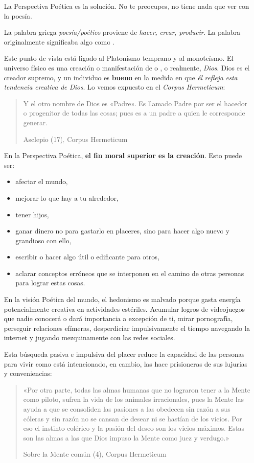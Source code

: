 \documentclass{article}
\begin{document}
	La Perspectiva Poética es la solución. No te preocupes, no tiene nada
	que ver con la poesía.

	La palabra griega \textit{poesía/poético} proviene de \textit{hacer,
	crear, producir}. La palabra  originalmente
	significaba algo como .

	Este punto de vista está ligado al Platonismo temprano y al monoteísmo.
	El universo físico es una creación o manifestación de
	 o , o realmente,
	\textit{Dios}. Dios es el creador supremo, y un individuo es
	\textbf{bueno} en la medida en que \textit{él refleja esta tendencia
	creativa de Dios}. Lo vemos expuesto en el \textit{Corpus Hermeticum}:

	\blockquote[Asclepio (17), Corpus Hermeticum \cite{uno}]
	{Y el otro nombre de Dios es «Padre». Es llamado Padre por ser el
	hacedor o progenitor de todas las cosas; pues es a un padre a quien le
	corresponde generar.}

	En la Perspectiva Poética, \textbf{el fin moral superior es la
	creación}. Esto puede ser:

	\begin{itemize}
	\item afectar el mundo,
	\item mejorar lo que hay a tu alrededor,
	\item tener hijos,
	\item ganar dinero no para gastarlo en placeres, sino para hacer algo
		nuevo y grandioso con ello,
	\item escribir o hacer algo útil o edificante para otros,
	\item aclarar conceptos erróneos que se interponen en el camino de otras
	personas para lograr estas cosas.
	\end{itemize}

	En la visión Poética del mundo, el hedonismo es malvado porque gasta
	energía potencialmente creativa en actividades estériles. Acumular logros
	de videojuegos que nadie conocerá o dará importancia a excepción de ti,
	mirar pornografía, perseguir relaciones efímeras, desperdiciar
	impulsivamente el tiempo navegando la internet y jugando mezquinamente
	con las redes sociales.

	Esta búsqueda pasiva e impulsiva del placer reduce la capacidad de
	las personas para vivir como está intencionado, en cambio, las hace
	prisioneras de sus lujurias y conveniencias:

	\blockquote[Sobre la Mente común (4), Corpus Hermeticum \cite{dos}]
	{«Por otra parte, todas las almas humanas que no lograron tener a
	la Mente como piloto, sufren la vida de los animales
	irracionales, pues la Mente las ayuda a que se consoliden las
	pasiones a las obedecen sin razón a sus cóleras y sin razón no
	se cansan de desear ni se hastían de los vicios. Por eso el
	instinto colérico y la pasión del deseo son los vicios máximos.
	Estas son las almas a las que Dios impuso la Mente como juez y
	verdugo.»}
\end{document}
